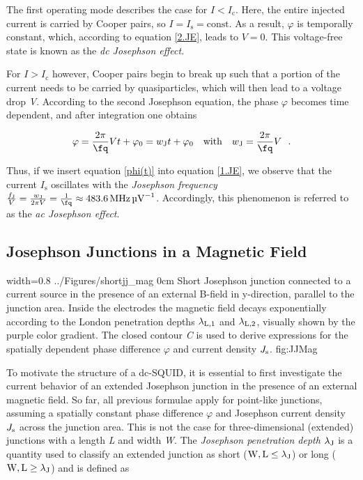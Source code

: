 The first operating mode describes the case for $I<I_\mathrm{c}$. Here, the entire injected current is carried by Cooper pairs, so $I=I_\mathrm{s}=\mathrm{const}$. As a result, $\varphi$ is temporally constant, which, according to equation \eqref{2.JE}, leads to $V=0$. This voltage-free state is known as the \textit{dc Josephson effect}.

For $I>I_\mathrm{c}$ however, Cooper pairs begin to break up such that a portion of the current needs to be carried by quasiparticles, which will then lead to a voltage drop \textit{V}. According to the second Josephson equation, the phase $\varphi$ becomes time dependent, and after integration one obtains

\begin{equation}
\label{phi(t)}
\varphi = \frac{2\pi}{\unit{\fq}}Vt + \varphi_0 = w_\mathrm{J}t + \varphi_0 \ \ \ \mathrm{with} \ \ \ w_\mathrm{J} = \frac{2\pi}{\unit{\fq}}V \ \ .
\end{equation}

Thus, if we insert equation \eqref{phi(t)} into equation \eqref{1.JE}, we observe that  the current $I_\mathrm{s}$ oscillates with the \textit{Josephson frequency} $\frac{f_\mathrm{J}}{V} = \frac{w_\mathrm{J}}{2\pi V} = \frac{1}{\unit{\fq}} \approx \SI{483.6}{\MHz\per\uV}$. Accordingly, this phenomenon is referred to as the \textit{ac Josephson effect}.



\subsection{Josephson Junctions in a Magnetic Field}

{width=0.8\textwidth}
{../Figures/shortjj_mag}
{0cm}
{Short Josephson junction connected to a current source in the presence of an external B-field in y-direction, parallel to the junction area. Inside the electrodes the magnetic field decays exponentially according to the London penetration depths $\lambda_{\rm L,1}$ and $\lambda_{\rm L,2}$, visually shown by the purple color gradient. The closed contour \textit{C} is used to derive expressions for the spatially dependent phase difference $\varphi$ and current density $J_{\rm s}$.} 
{fig:JJMag}

To motivate the structure of a dc-SQUID, it is essential to first investigate the current behavior of an extended Josephson junction in the presence of an external magnetic field. So far, all previous formulae apply for point-like junctions, assuming a spatially constant phase difference $\varphi$ and Josephson current density $J_{\rm s}$ across the junction area. This is not the case for three-dimensional (extended) junctions with a length \textit{L} and width \textit{W}. The \textit{Josephson penetration depth} $\lambda_{\rm J}$ is a quantity used to classify an extended junction as short ($\rm W,L \leq\lambda_{\rm J}$) or long ($\rm W,L \geq\lambda_{\rm J}$) and is defined as 

